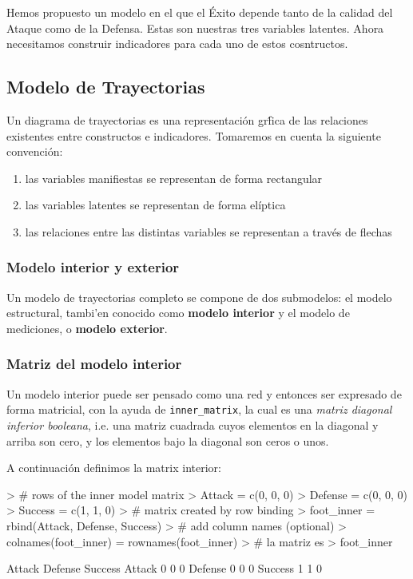\documentclass{paper}
\begin{document}
Hemos propuesto un modelo en el que el \'Exito depende tanto de la calidad del Ataque como de la Defensa. Estas son nuestras tres variables latentes. Ahora necesitamos construir indicadores para cada uno de estos cosntructos.

\subsection{Modelo de Trayectorias}

Un diagrama de trayectorias es una representaci\'on gr\'fica de las relaciones existentes entre constructos e indicadores. Tomaremos en cuenta la siguiente convenci\'on:
\begin{enumerate}
  \item las variables manifiestas se representan de forma rectangular
  \item las variables latentes se representan de forma el\'iptica
  \item las relaciones entre las distintas variables se representan a trav\'es de flechas
\end{enumerate}

\subsubsection{Modelo interior y exterior}

Un modelo de trayectorias completo se compone de dos submodelos: el modelo estructural, tambi'en conocido como {\bf modelo interior} y el modelo de mediciones, o {\bf modelo exterior}.

\subsubsection{Matriz del modelo interior}

Un modelo interior puede ser pensado como una red y entonces ser expresado de forma matricial, con la ayuda de \texttt{inner\_matrix}, la cual es una {\em matriz diagonal inferior booleana}, i.e. una matriz cuadrada cuyos elementos en la diagonal y arriba son cero, y los elementos bajo la diagonal son ceros o unos.

A continuaci\'on definimos la matrix interior:
\begin{Schunk}
\begin{Sinput}
> # rows of the inner model matrix
> Attack = c(0, 0, 0)
> Defense = c(0, 0, 0)
> Success = c(1, 1, 0)
> # matrix created by row binding
> foot_inner = rbind(Attack, Defense, Success)
> # add column names (optional)
> colnames(foot_inner) = rownames(foot_inner)
> # la matriz es
> foot_inner
\end{Sinput}
\begin{Soutput}
        Attack Defense Success
Attack       0       0       0
Defense      0       0       0
Success      1       1       0
\end{Soutput}
\end{Schunk}
\end{document}
